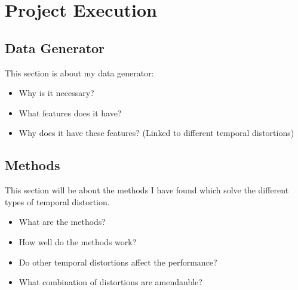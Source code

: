 \chapter{Project Execution}
\label{chap:execution}
%
%
%
%

\section{Data Generator}
This section is about my data generator:
\begin{itemize}
    \item Why is it necessary?
    \item What features does it have?
    \item Why does it have these features? (Linked to different temporal distortions)
\end{itemize}

\section{Methods}
This section will be about the methods I have found which solve the different
types of temporal distortion.
\begin{itemize}
    \item What are the methods?
    \item How well do the methods work?
    \item Do other temporal distortions affect the performance?
    \item What combination of distortions are amendanble?
\end{itemize}
